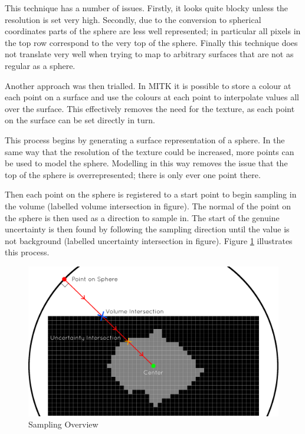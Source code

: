 This technique has a number of issues. Firstly, it looks quite blocky unless the resolution is set very high. Secondly, due to the conversion to spherical coordinates parts of the sphere are less well represented; in particular all pixels in the top row correspond to the very top of the sphere. Finally this technique does not translate very well when trying to map to arbitrary surfaces that are not as regular as a sphere.

Another approach was then trialled. In MITK it is possible to store a colour at each point on a surface and use the colours at each point to interpolate values all over the surface. This effectively removes the need for the texture, as each point on the surface can be set directly in turn.

This process begins by generating a surface representation of a sphere. In the same way that the resolution of the texture could be increased, more points can be used to model the sphere. Modelling in this way removes the issue that the top of the sphere is overrepresented; there is only ever one point there.

Then each point on the sphere is registered to a start point to begin sampling in the volume (labelled volume intersection in figure). The normal of the point on the sphere is then used as a direction to sample in. The start of the genuine uncertainty is then found by following the sampling direction until the value is not background (labelled uncertainty intersection in figure). Figure \ref{fig:surface_sampling_example} illustrates this process.

\begin{figure}[H]
  \centering
  \includegraphics[width=\textwidth]{images/surface/sampling_example.png}
  \caption{Sampling Overview}\label{fig:surface_sampling_example}
\end{figure}

